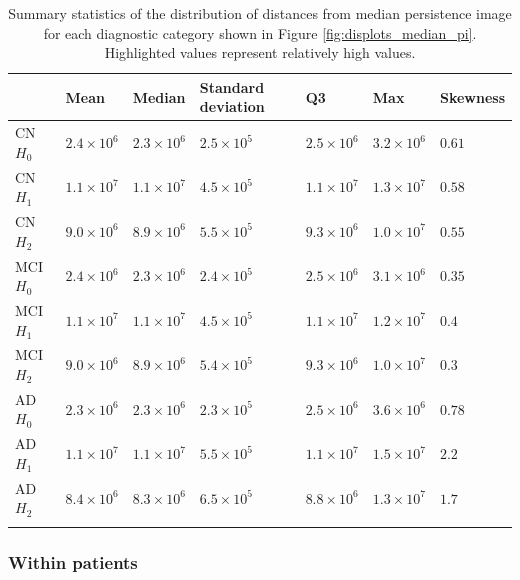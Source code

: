 \documentclass{article}
\begin{document}
\begin{table}
\centering
\begin{tabular}{lllllll}
  \toprule {}
  & Mean & Median & Standard deviation & Q3 & Max & Skewness \\
  \midrule
  CN $H_0$ & $2.4\times10^{6}$ & $2.3\times10^{6}$ & $2.5\times10^{5}$ & $2.5\times10^{6}$ & $3.2\times10^{6}$ & $0.61$ \\
  CN $H_1$ & $1.1\times10^{7}$ & $1.1\times10^{7}$ & $4.5\times10^{5}$ & $1.1\times10^{7}$ & $1.3\times10^{7}$ & $0.58$ \\
  CN $H_2$ & $9.0\times10^{6}$ & $8.9\times10^{6}$ & $5.5\times10^{5}$ & $9.3\times10^{6}$ & $1.0\times10^{7}$ & $0.55$ \\
  MCI $H_0$ & $2.4\times10^{6}$ & $2.3\times10^{6}$ & $2.4\times10^{5}$ & $2.5\times10^{6}$ & $3.1\times10^{6}$ & $0.35$ \\
  MCI $H_1$ & $1.1\times10^{7}$ & $1.1\times10^{7}$ & $4.5\times10^{5}$ & $1.1\times10^{7}$ & $1.2\times10^{7}$ & $0.4$ \\
  MCI $H_2$ & $9.0\times10^{6}$ & $8.9\times10^{6}$ & $5.4\times10^{5}$ & $9.3\times10^{6}$ & $1.0\times10^{7}$ & $0.3$ \\
  AD $H_0$ & $2.3\times10^{6}$ & $2.3\times10^{6}$ & $2.3\times10^{5}$ & $2.5\times10^{6}$ & $3.6\times10^{6}$ & $0.78$ \\
  AD $H_1$ & $1.1\times10^{7}$ & $1.1\times10^{7}$ & $5.5\times10^{5}$ & $1.1\times10^{7}$ & $1.5\times10^{7}$ & $\mathbf{2.2}$ \\
  AD $H_2$ & $8.4\times10^{6}$ & $8.3\times10^{6}$ & $6.5\times10^{5}$ & $8.8\times10^{6}$ & $1.3\times10^{7}$ & $\mathbf{1.7}$ \\
  \bottomrule
  \vspace{1pt}
\end{tabular}
\caption{Summary statistics of the distribution of distances from median persistence image for each
diagnostic category shown in Figure \ref{fig:displots_median_pi}. Highlighted values represent
relatively high values.}
\label{tab:stats_median_pi}
\end{table}



\subsubsection{Within patients}
\end{document}
